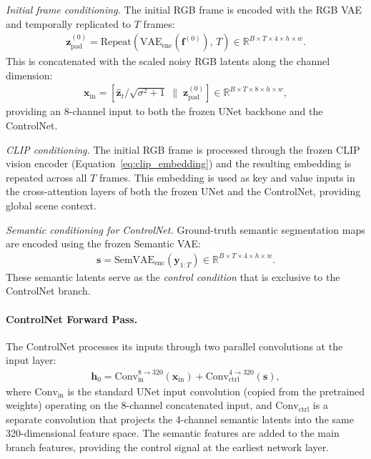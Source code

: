 \textit{Initial frame conditioning.} The initial RGB frame is encoded with the RGB VAE and temporally replicated to $T$ frames:
\begin{align}
    \mathbf{z}^{(0)}_{\text{pad}} = \text{Repeat}\!\left(\text{VAE}_{\text{enc}}(\mathbf{f}^{(0)}),\, T\right) \in \mathbb{R}^{B \times T \times 4 \times h \times w}.
    \label{eq:frame_padding_stage2}
\end{align}
This is concatenated with the scaled noisy RGB latents along the channel dimension:
\begin{align}
    \mathbf{x}_{\text{in}} = \left[\hat{\mathbf{z}}_t / \sqrt{\sigma^2 + 1} \;\|\; \mathbf{z}^{(0)}_{\text{pad}}\right] \in \mathbb{R}^{B \times T \times 8 \times h \times w},
    \label{eq:unet_input_stage2}
\end{align}
providing an 8-channel input to both the frozen UNet backbone and the ControlNet.

\textit{CLIP conditioning.} The initial RGB frame is processed through the frozen CLIP vision encoder (Equation~\ref{eq:clip_embedding}) and the resulting embedding is repeated across all $T$ frames. This embedding is used as key and value inputs in the cross-attention layers of both the frozen UNet and the ControlNet, providing global scene context.

\textit{Semantic conditioning for ControlNet.} Ground-truth semantic segmentation maps are encoded using the frozen Semantic VAE:
\begin{align}
    \mathbf{s} = \text{SemVAE}_{\text{enc}}(\mathbf{y}_{1:T}) \in \mathbb{R}^{B \times T \times 4 \times h \times w}.
    \label{eq:semantic_cond_stage2}
\end{align}
These semantic latents serve as the \emph{control condition} that is exclusive to the ControlNet branch.

\paragraph{ControlNet Forward Pass.}
The ControlNet processes its inputs through two parallel convolutions at the input layer:
\begin{align}
    \mathbf{h}_0 = \text{Conv}_{\text{in}}^{8 \rightarrow 320}(\mathbf{x}_{\text{in}}) + \text{Conv}_{\text{ctrl}}^{4 \rightarrow 320}(\mathbf{s}),
    \label{eq:controlnet_input}
\end{align}
where $\text{Conv}_{\text{in}}$ is the standard UNet input convolution (copied from the pretrained weights) operating on the 8-channel concatenated input, and $\text{Conv}_{\text{ctrl}}$ is a separate convolution that projects the 4-channel semantic latents into the same 320-dimensional feature space. The semantic features are added to the main branch features, providing the control signal at the earliest network layer.

